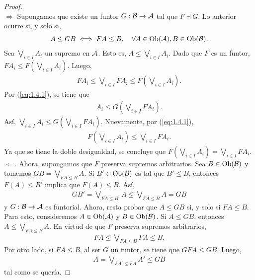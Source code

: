     \begin{proof}\text{}\\
    $\boxed{\Longrightarrow}$
        Supongamos que existe un funtor $G:{\mathcal B}\to {\mathcal A}$ tal que $F\dashv G$. Lo anterior ocurre si, y solo  si, 
        \begin{equation}\label{eq:1.4.1}
            A\leq GB\iff FA\leq B, \quad\forall A\in \operatorname{Ob}({\mathcal A}), B\in\operatorname{Ob}({\mathcal B}).
        \end{equation}
        Sea $\bigvee_{i\in I} A_i$ un supremo en ${\mathcal A}$. Esto es, $A\leq \bigvee_{i\in I} A_i$. Dado que $F$ es un funtor, $FA_i\leq F\left(\bigvee_{i\in I}A_i\right)$. Luego, 
        \begin{eqnarray*}
            FA_i\leq \bigvee_{i\in I}FA_i\leq F\left(\bigvee_{i\in I}A_i\right).
        \end{eqnarray*}
        Por (\ref{eq:1.4.1}), se tiene que 
        \begin{eqnarray*}
           A_i\leq G\left(\bigvee_{i\in I}F A_i\right).
        \end{eqnarray*}
        Así, $\bigvee_{i\in I}A_i\leq G\left(\bigvee_{i\in I}FA_i\right)$. Nuevamente, por (\ref{eq:1.4.1}), 
        \begin{eqnarray*}
        F\left(\bigvee_{i\in I}A_i\right)\leq \bigvee_{i\in I}FA_i.
        \end{eqnarray*}
        Ya que se tiene la doble desigualdad, se concluye que $F\left(\bigvee_{i\in I}A_i\right)=\bigvee_{i\in I} FA_i$.\\
        $\boxed{\Longleftarrow}$. Ahora, supongamos que $F$ preserva supremos arbitrarios. Sea $B\in\operatorname{Ob}({\mathcal B})$ y tomemos $GB=\bigvee_{FA\leq B}A$. Si $B'\in\operatorname{Ob}({\mathcal B})$ es tal que $B'\leq B$, entonces $F(A)\leq B'$ implica que $F(A)\leq B$. Así, 
        \begin{eqnarray*}
            GB'=\bigvee_{FA\leq B'} A\leq\bigvee_{FA\leq B} A=GB
        \end{eqnarray*}
        y $G:{\mathcal B}\to{\mathcal A}$ es funtorial. Ahora, resta probar que $A\leq GB$ si, y solo si $FA\leq B$. Para esto, consideremos $A\in\operatorname{Ob}({\mathcal A})$ y $B\in\operatorname{Ob}({\mathcal B})$. Si $A\leq GB$, entonces $A\leq\bigvee_{FA\leq B}A$. En virtud de que $F$ preserva supremos arbitrarios, 
        \begin{eqnarray*}
            FA\leq \bigvee_{FA\leq B}FA\leq B.
        \end{eqnarray*}
        Por otro lado, si $FA\leq B$, al ser $G$ un funtor, se tiene que $GFA\leq GB$. Luego, 
        \begin{eqnarray*}
            A=\bigvee_{FA'\leq FA}A'\leq GB
        \end{eqnarray*}
        tal como se quería.
    \end{proof}
